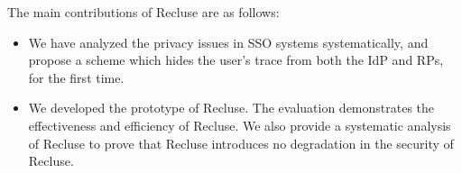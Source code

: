 

The main contributions of Recluse are as follows:
\begin{itemize}
\item We have analyzed the privacy issues in SSO systems systematically, and propose a scheme which hides the user's trace from both the IdP and RPs, for the first time.
\item We developed the prototype of Recluse. The evaluation demonstrates the effectiveness and efficiency of Recluse. We also provide a systematic analysis of Recluse to prove that Recluse introduces no degradation in the security of Recluse.
\end{itemize}



